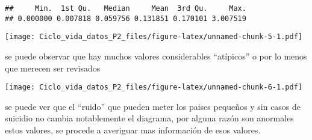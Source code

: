 \documentclass[]{article}
\newenvironment{Shaded}{\begin{snugshade}}{\end{snugshade}}
\newcommand{\KeywordTok}[1]{\textcolor[rgb]{0.13,0.29,0.53}{\textbf{#1}}}
\newcommand{\DecValTok}[1]{\textcolor[rgb]{0.00,0.00,0.81}{#1}}
\newcommand{\StringTok}[1]{\textcolor[rgb]{0.31,0.60,0.02}{#1}}
\newcommand{\OperatorTok}[1]{\textcolor[rgb]{0.81,0.36,0.00}{\textbf{#1}}}
\newcommand{\NormalTok}[1]{#1}
\begin{document}
\begin{Shaded}
\end{Shaded}

\begin{verbatim}
##     Min.  1st Qu.   Median     Mean  3rd Qu.     Max. 
## 0.000000 0.007818 0.059756 0.131851 0.170101 3.007519
\end{verbatim}

\begin{Shaded}
\end{Shaded}

\texttt{[image: Ciclo\_vida\_datos\_P2\_files/figure-latex/unnamed-chunk-5-1.pdf]}

se puede observar que hay muchos valores considerables ``atípicos'' o
por lo menos que merecen ser revisados

\begin{Shaded}
\end{Shaded}

\texttt{[image: Ciclo\_vida\_datos\_P2\_files/figure-latex/unnamed-chunk-6-1.pdf]}

se puede ver que el ``ruido'' que pueden meter los paises pequeños y sin
casos de suicidio no cambia notablemente el diagrama, por alguna razón
son anormales estos valores, se procede a averiguar mas información de
esos valores.
\end{document}

